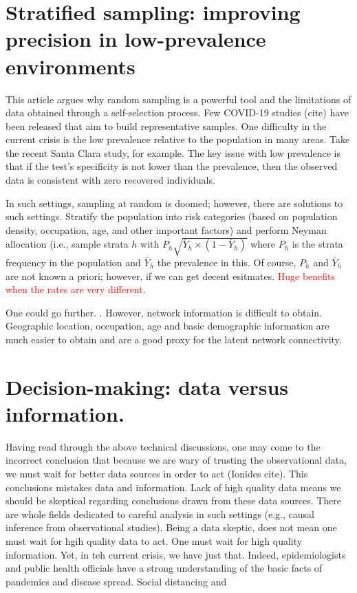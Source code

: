 \documentclass[aoas]{amsart}
\begin{document}
\section{Stratified sampling: improving precision in low-prevalence environments}

This article argues why random sampling is a powerful tool and the limitations of data obtained through a self-selection process.  Few COVID-19 studies (cite) have been released that aim to build representative samples.  One difficulty in the current crisis is the low prevalence relative to the population in many areas.  Take the recent Santa Clara study, for example.  The key issue with low prevalence is that if the test's specificity is not lower than the prevalence, then the observed data is consistent with zero recovered individuals.

In such settings, sampling at random is doomed; however, there are solutions to such settings.  Stratify the population into risk categories (based on population density, occupation, age, and other important factors) and perform Neyman allocation (i.e., sample strata $h$ with $P_h \sqrt{\bar Y_h \times (1-\bar Y_h)}$ where $P_h$ is the strata frequency in the population and $\bar Y_h$ the prevalence in this.  Of course, $P_h$ and $\bar Y_h$ are not known a priori; however, if we can get decent esitmates. \textcolor{red}{Huge benefits when the rates are very different.}

One could go further. \textcolor{explain network stuff}.  However, network information is difficult to obtain.  Geographic location, occupation, age and basic demographic information are much easier to obtain and are a good proxy for the latent network connectivity.


\section{Decision-making: data versus information.}

Having read through the above technical discussions, one may come to the incorrect conclusion that because we are wary of trusting the observational data, we must wait for better data sources in order to act (Ionides cite).  This conclusions mistakes data and information.  Lack of high quality data means we should be skeptical regarding conclusions drawn from these data sources.  There are whole fields dedicated to careful analysis in such settings (e.g., causal inference from observational studies).  Being a data skeptic, does not mean one must wait for hgih quality data to act.  One must wait for high quality information.  Yet, in teh current crisis, we have just that.  Indeed, epidemiologists and public health officials have a strong understanding of the basic facts of pandemics and disease spread.  Social distancing and
\end{document}
